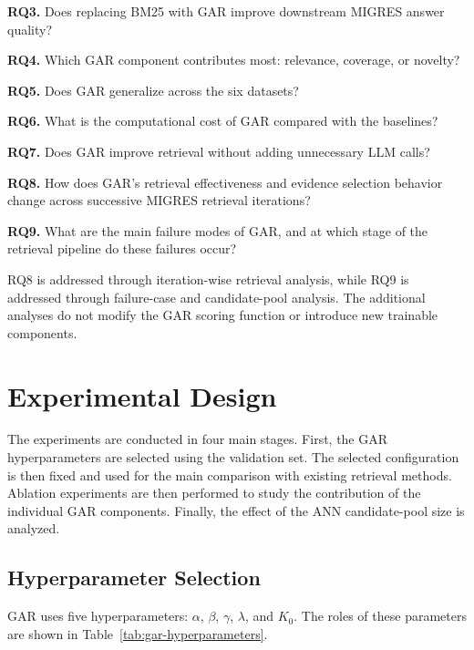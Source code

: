 \documentclass[12pt,a4paper]{report}
\begin{document}
\textbf{RQ3.} Does replacing BM25 with GAR improve downstream MIGRES answer quality?

\textbf{RQ4.} Which GAR component contributes most: relevance, coverage, or novelty?

\textbf{RQ5.} Does GAR generalize across the six datasets?

\textbf{RQ6.} What is the computational cost of GAR compared with the baselines?

\textbf{RQ7.} Does GAR improve retrieval without adding unnecessary LLM calls?

\textbf{RQ8.} How does GAR's retrieval effectiveness and evidence selection behavior change across successive MIGRES retrieval iterations?

\textbf{RQ9.} What are the main failure modes of GAR, and at which stage of the retrieval pipeline do these failures occur?

RQ8 is addressed through iteration-wise retrieval analysis, while RQ9 is addressed through failure-case and candidate-pool analysis. The additional analyses do not modify the GAR scoring function or introduce new trainable components.

\section{Experimental Design}

The experiments are conducted in four main stages. First, the GAR hyperparameters are selected using the validation set. The selected configuration is then fixed and used for the main comparison with existing retrieval methods. Ablation experiments are then performed to study the contribution of the individual GAR components. Finally, the effect of the ANN candidate-pool size is analyzed.

\subsection{Hyperparameter Selection}

GAR uses five hyperparameters: $\alpha$, $\beta$, $\gamma$, $\lambda$, and $K_0$. The roles of these parameters are shown in Table~\ref{tab:gar-hyperparameters}.
\end{document}
